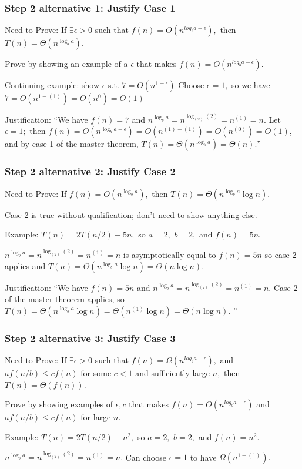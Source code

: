 \documentclass{beamer}
\begin{document}
 \begin{frame} \frametitle{Step 2 alternative 1: Justify Case 1}
  Need to Prove: If $\exists \epsilon>0$ such that $f(n) = O(n^{log_b a-\epsilon}),$ then $T(n)=\Theta(n^{\log_b a}).$
  \vspace{10pt}

  Prove by showing an example of a $\epsilon$ that makes $f(n) = O(n^{log_b a-\epsilon}).$
  \vspace{10pt}

  Continuing example: show $\epsilon$ s.t. $7 = O(n^{1-\epsilon})$
  Choose $\epsilon=1,$ so we have $7=O(n^{1-(1)}) = O(n^0) = O(1)$
  \vspace{10pt}

  Justification: ``We have $f(n)=7$ and $n^{\log_b a} = n^{\log_{(2)} (2)} = n^{(1)} = n.$ Let $\epsilon=1;$
  then $f(n) = O(n^{\log_b a - \epsilon}) = O(n^{(1)-(1)}) = O(n^{(0)}) = O(1)$, and by case 1 of the master theorem,
  $T(n) = \Theta(n^{\log_b a}) = \Theta(n).$''

\end{frame}

 \begin{frame} \frametitle{Step 2 alternative 2: Justify Case 2}
  Need to Prove: If $f(n) = O(n^{\log_b a}),$ then $T(n)=\Theta(n^{\log_b a} \log n).$
  \vspace{10pt}

  Case 2 is true without qualification; don't need to show anything else.
  \vspace{10pt}

  Example: $T(n) = 2T(n/2) + 5n,$ so $a=2,$ $b=2,$ and $f(n)=5n.$
  \vspace{10pt}

  $n^{\log_b a} = n^{\log_{(2)} (2)} = n^{(1)} = n$ is asymptotically equal to $f(n)=5n$ so case 2 applies
  and $T(n)=\Theta(n^{\log_b a} \log n) = \Theta(n \log n).$
  \vspace{10pt}

 Justification: ``We have $f(n)=5n$ and $n^{\log_b a} = n^{\log_{(2)} (2)} = n^{(1)} = n.$ Case 2 of the
 master theorem applies, so $T(n)=\Theta(n^{\log_b a} \log n) = \Theta(n^{(1)} \log n) = \Theta(n \log n).$ ''
 \end{frame}


 \begin{frame} \frametitle{Step 2 alternative 3: Justify Case 3}
  Need to Prove: If $\exists \epsilon>0$ such that $f(n) = \Omega(n^{log_b a+\epsilon}),$
  and $a f(n/b) \leq cf(n)$ for some $c<1$ and sufficiently large $n,$
  then $T(n)=\Theta(f(n)).$
  \vspace{10pt}

  Prove by showing examples of $\epsilon, c$ that makes $f(n) = O(n^{log_b a+\epsilon})$
  and $a f(n/b) \leq cf(n)$ for large $n$.
  \vspace{10pt}

  Example: $T(n) = 2T(n/2) + n^2,$ so $a=2,$ $b=2,$ and $f(n)=n^2.$
  \vspace{10pt}

  $n^{\log_b a} = n^{\log_{(2)} (2)} = n^{(1)} = n.$ Can choose $\epsilon=1$ to have $\Omega(n^{1+(1)}).$
  \vspace{10pt}
\end{frame}
\end{document}
